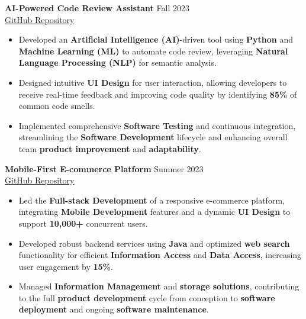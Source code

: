 \documentclass[11pt,a4paper,sans]{article}
\begin{document}
\textbf{AI-Powered Code Review Assistant} \hfill Fall 2023 \\
\href{https://github.com/alexchen-dev/ai-code-reviewer}{GitHub Repository}
\begin{itemize}[leftmargin=*]
    \item Developed an \textbf{Artificial Intelligence (AI)}-driven tool using \textbf{Python} and \textbf{Machine Learning (ML)} to automate code review, leveraging \textbf{Natural Language Processing (NLP)} for semantic analysis.
    \item Designed intuitive \textbf{UI Design} for user interaction, allowing developers to receive real-time feedback and improving code quality by identifying \textbf{85\%} of common code smells.
    \item Implemented comprehensive \textbf{Software Testing} and continuous integration, streamlining the \textbf{Software Development} lifecycle and enhancing overall team \textbf{product improvement} and \textbf{adaptability}.
\end{itemize}

\textbf{Mobile-First E-commerce Platform} \hfill Summer 2023 \\
\href{https://github.com/alexchen-dev/mobile-ecommerce-platform}{GitHub Repository}
\begin{itemize}[leftmargin=*]
    \item Led the \textbf{Full-stack Development} of a responsive e-commerce platform, integrating \textbf{Mobile Development} features and a dynamic \textbf{UI Design} to support \textbf{10,000+} concurrent users.
    \item Developed robust backend services using \textbf{Java} and optimized \textbf{web search} functionality for efficient \textbf{Information Access} and \textbf{Data Access}, increasing user engagement by \textbf{15\%}.
    \item Managed \textbf{Information Management} and \textbf{storage solutions}, contributing to the full \textbf{product development} cycle from conception to \textbf{software deployment} and ongoing \textbf{software maintenance}.
\end{itemize}

\end{document}
